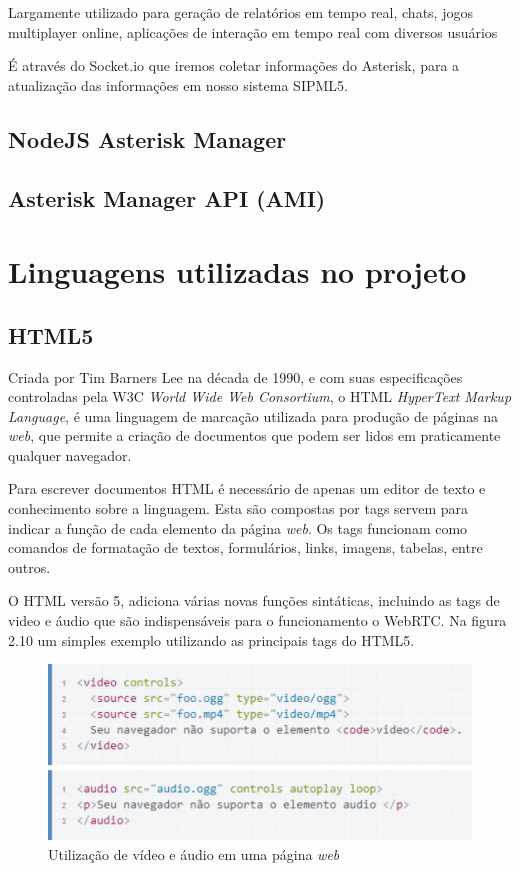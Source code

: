 \documentclass[ruledheader]{abnt} %
\begin{document}
Largamente utilizado para geração de relatórios em tempo real, chats, jogos multiplayer online, aplicações de interação em tempo real com diversos usuários 

É através do Socket.io que iremos coletar informações do Asterisk, para a atualização das informações em nosso sistema SIPML5.

\subsection{NodeJS Asterisk Manager}


\subsection{Asterisk Manager API (AMI)}


\section{Linguagens utilizadas no projeto}
\label{s_linguagensProjeto}

\subsection{HTML5}
\label{ss_html5}
Criada por Tim Barners Lee na década de 1990, e com suas especificações controladas pela W3C \textit{World Wide Web Consortium}, o HTML \textit{HyperText Markup Language}, é uma linguagem  de marcação utilizada para produção de páginas na \textit{web}, que permite a criação de documentos que podem ser lidos em praticamente qualquer navegador.

Para escrever documentos HTML é necessário de apenas um editor de texto e conhecimento sobre a linguagem. Esta são compostas por tags servem para indicar a função de cada elemento da página \textit{web}. Os tags funcionam como comandos de formatação de textos, formulários, links, imagens, tabelas, entre outros.

O HTML versão 5, adiciona várias novas funções sintáticas, incluindo as tags de video e áudio que são indispensáveis para o funcionamento o WebRTC. Na figura 2.10 um simples exemplo utilizando as principais tags do HTML5.

\begin{figure}[!htdb]
 \centering
  \includegraphics[width = 1\linewidth]{images/html5}
  \caption{Utilização de vídeo e áudio em uma página \textit{web}} %
  \label{f_mediaStream}
\end{figure}
\end{document}
